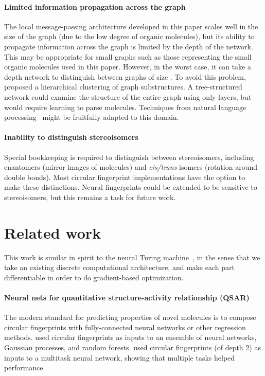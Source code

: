 \documentclass{article}
\newcommand{\citep}{\cite}
\newcommand{\citet}{\cite}
\begin{document}
\paragraph{Limited information propagation across the graph}
The local message-passing architecture developed in this paper scales well in the size of the graph (due to the low degree of organic molecules), but its ability to propagate information across the graph is limited by the depth of the network.
This may be appropriate for small graphs such as those representing the small organic molecules used in this paper.
However, in the worst case, it can take a depth  network to distinguish between graphs of size .
To avoid this problem, \citet{bruna2013spectral} proposed a hierarchical clustering of graph substructures.
A tree-structured network could examine the structure of the entire graph using only  layers, but would require learning to parse molecules.
Techniques from natural language processing~\citep{tai2015improved} might be fruitfully adapted to this domain.

\paragraph{Inability to distinguish stereoisomers}
Special bookkeeping is required to distinguish between stereoisomers, including enantomers (mirror images of molecules) and {\it cis/trans} isomers (rotation around double bonds).
Most circular fingerprint implementations have the option to make these distinctions.
Neural fingerprints could be extended to be sensitive to stereoisomers, but this remains a task for future work.










\section{Related work}
This work is similar in spirit to the neural Turing machine~\citep{graves2014neural}, in the sense that we take an existing discrete computational architecture, and make each part differentiable in order to do gradient-based optimization.

\paragraph{Neural nets for quantitative structure-activity relationship (QSAR)}
The modern standard for predicting properties of novel molecules is to compose circular fingerprints with fully-connected neural networks or other regression methods.
\cite{dahl2014multi} used circular fingerprints as inputs to an ensemble of neural networks, Gaussian processes, and random forests.
\cite{ramsundar2015massively} used circular fingerprints (of depth 2) as inputs to a multitask neural network, showing that multiple tasks helped performance.
\end{document}
